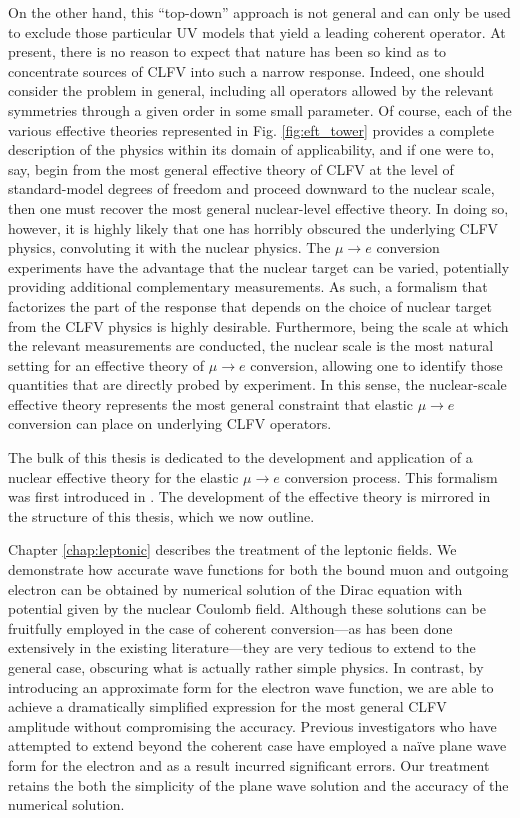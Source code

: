 \documentclass{book}[letterpaper,12pt]
\begin{document}
On the other hand, this ``top-down'' approach is not general and can only be used to exclude those particular UV models that yield a leading coherent operator. At present, there is no reason to expect that nature has been so kind as to concentrate sources of CLFV into such a narrow response. Indeed, one should consider the problem in general, including all operators allowed by the relevant symmetries through a given order in some small parameter. Of course, each of the various effective theories represented in Fig. \ref{fig:eft_tower} provides a complete description of the physics within its domain of applicability, and if one were to, say, begin from the most general effective theory of CLFV at the level of standard-model degrees of freedom and proceed downward to the nuclear scale, then one must recover the most general nuclear-level effective theory. In doing so, however, it is highly likely that one has horribly obscured the underlying CLFV physics, convoluting it with the nuclear physics. The $\mu\rightarrow e$ conversion experiments have the advantage that the nuclear target can be varied, potentially providing additional complementary measurements. As such, a formalism that factorizes the part of the response that depends on the choice of nuclear target from the CLFV physics is highly desirable. Furthermore, being the scale at which the relevant measurements are conducted, the nuclear scale is the most natural setting for an effective theory of $\mu\rightarrow e$ conversion, allowing one to identify those quantities that are directly probed by experiment. In this sense, the nuclear-scale effective theory represents the most general constraint that elastic $\mu\rightarrow e$ conversion can place on underlying CLFV operators.

The bulk of this thesis is dedicated to the development and application of a nuclear effective theory for the elastic $\mu\rightarrow e$ conversion process. This formalism was first introduced in \cite{rule2021nucleonlevel,haxton_2022}. The development of the effective theory is mirrored in the structure of this thesis, which we now outline.

Chapter \ref{chap:leptonic} describes the treatment of the leptonic fields. We demonstrate how accurate wave functions for both the bound muon and outgoing electron can be obtained by numerical solution of the Dirac equation with potential given by the nuclear Coulomb field. Although these solutions can be fruitfully employed in the case of coherent conversion---as has been done extensively in the existing literature---they are very tedious to extend to the general case, obscuring what is actually rather simple physics. In contrast, by introducing an approximate form for the electron wave function, we are able to achieve a dramatically simplified expression for the most general CLFV amplitude without compromising the accuracy. Previous investigators who have attempted to extend beyond the coherent case have employed a na\"ive plane wave form for the electron and as a result incurred significant errors. Our treatment retains the both the simplicity of the plane wave solution and the accuracy of the numerical solution.
\end{document}
